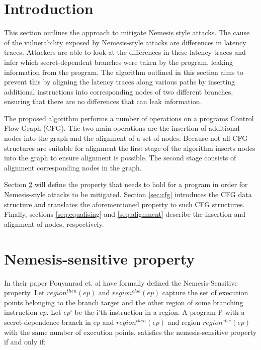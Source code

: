 
\label{cha:design}

\section{Introduction}
This section outlines the approach to mitigate Nemesis style attacks. The cause of the vulnerability exposed by Nemesis-style attacks are differences in 
latency traces. Attackers are able to look at the differences in these latency traces and infer which secret-dependent branches were taken by the program, 
leaking information from the program. The algorithm outlined in this section aims to prevent this by aligning the latency traces along various paths by 
inserting additional instructions into corresponding nodes of two different branches, ensuring that there are no differences that can leak information. 

The proposed algorithm performs a number of operations on a programs Control Flow Graph (CFG). The two main operations are the insertion of additional nodes into the graph and the alignment of a set of nodes. 
Because not all CFG structures are suitable for alignment the first stage of the algorithm inserts nodes into the graph to ensure alignment is possible. The second stage consists of alignment corresponding nodes 
in the graph. 

Section \ref{sec:property} will define the property that needs to hold for a program in order for Nemesis-style attacks to be mitigated. Section \ref{sec:cfg} introduces the CFG data structure and translates the aforementioned property to such CFG structures. Finally, sections \ref{seq:equalising} and \ref{seq:alignment} describe the insertion and alignment of nodes, respectively. 

\section{Nemesis-sensitive property}\label{sec:property}
In their paper Pouyanrad et. al have formally defined the Nemesis-Sensitive property.  Let $region^{then}(ep)$ and $region^{else}(ep)$ capture the set of execution points belonging to the branch target and the other region of some branching instruction $ep$. Let $ep^i$ be the i'th instruction in a region. A program P with a secret-dependence branch in $ep$ and $region^{then}(ep)$ 
and region $region^{else}(ep)$ with the same number of execution points, satisfies the nemesis-sensitive property if and only if:  

